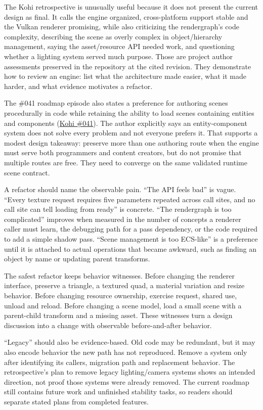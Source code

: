 The Kohi retrospective is unusually useful because it does not present the current design as final. It calls the engine organized, cross-platform support stable and the Vulkan renderer promising, while also criticizing the rendergraph's code complexity, describing the scene as overly complex in object/hierarchy management, saying the asset/resource API needed work, and questioning whether a lighting system served much purpose. Those are project author assessments preserved in the repository at the cited revision. They demonstrate how to review an engine: list what the architecture made easier, what it made harder, and what evidence motivates a refactor.

The \#041 roadmap episode also states a preference for authoring scenes procedurally in code while retaining the ability to load scenes containing entities and components (\href{https://www.youtube.com/watch?v=SS8Zn13cZus}{Kohi \#041}). The author explicitly says an entity-component system does not solve every problem and not everyone prefers it. That supports a modest design takeaway: preserve more than one authoring route when the engine must serve both programmers and content creators, but do not promise that multiple routes are free. They need to converge on the same validated runtime scene contract.

A refactor should name the observable pain. ``The API feels bad'' is vague. ``Every texture request requires five parameters repeated across call sites, and no call site can tell loading from ready'' is concrete. ``The rendergraph is too complicated'' improves when measured in the number of concepts a renderer caller must learn, the debugging path for a pass dependency, or the code required to add a simple shadow pass. ``Scene management is too ECS-like'' is a preference until it is attached to actual operations that became awkward, such as finding an object by name or updating parent transforms.

The safest refactor keeps behavior witnesses. Before changing the renderer interface, preserve a triangle, a textured quad, a material variation and resize behavior. Before changing resource ownership, exercise request, shared use, unload and reload. Before changing a scene model, load a small scene with a parent-child transform and a missing asset. These witnesses turn a design discussion into a change with observable before-and-after behavior.

``Legacy'' should also be evidence-based. Old code may be redundant, but it may also encode behavior the new path has not reproduced. Remove a system only after identifying its callers, migration path and replacement behavior. The retrospective's plan to remove legacy lighting/camera systems shows an intended direction, not proof those systems were already removed. The current roadmap still contains future work and unfinished stability tasks, so readers should separate stated plans from completed features.

